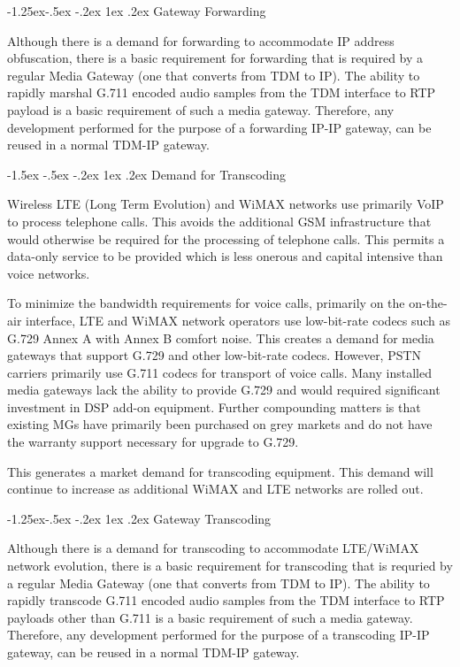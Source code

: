 \documentclass[letterpaper,final,notitlepage,twocolumn,10pt,twoside]{article}
\makeatletter
\let\normalsize = \small
\let\small = \footnotesize
\let\footnotesize = \scriptsize
\let\scriptsize = \tiny
\renewcommand\subsection{\@startsection{subsection}{2}{\z@}%
                                     {-1.5ex \@plus -.5ex \@minus -.2ex}%
                                     {1ex \@plus .2ex}%
                                     {\normalfont\normalsize\bfseries}}
\renewcommand\subsubsection{\@startsection{subsubsection}{3}{\z@}%
                                     {-1.25ex\@plus -.5ex \@minus -.2ex}%
                                     {1ex \@plus .2ex}%
                                     {\normalfont\normalsize\bfseries}}
\makeatother
\begin{document}
\subsubsection{Gateway Forwarding}

Although there is a demand for forwarding to accommodate IP address
obfuscation, there is a basic requirement for forwarding that is required by
a regular Media Gateway (one that converts from TDM to IP).  The ability to
rapidly marshal G.711 encoded audio samples from the TDM interface to RTP
payload is a basic requirement of such a media gateway.  Therefore, any
development performed for the purpose of a forwarding IP-IP gateway, can be
reused in a normal TDM-IP gateway.

\subsection{Demand for Transcoding}

Wireless LTE (Long Term Evolution) and WiMAX networks use primarily VoIP to
process telephone calls.  This avoids the additional GSM infrastructure that
would otherwise be required for the processing of telephone calls.  This permits
a data-only service to be provided which is less onerous and capital intensive
than voice networks.

To minimize the bandwidth requirements for voice calls, primarily on the
on-the-air interface, LTE and WiMAX network operators use low-bit-rate codecs
such as G.729 Annex A with Annex B comfort noise.  This creates a demand for
media gateways that support G.729 and other low-bit-rate codecs.  However, PSTN
carriers primarily use G.711 codecs for transport of voice calls.  Many
installed media gateways lack the ability to provide G.729 and would required
significant investment in DSP add-on equipment.  Further compounding matters is
that existing MGs have primarily been purchased on grey markets and do not have
the warranty support necessary for upgrade to G.729.

This generates a market demand for transcoding equipment.  This demand will
continue to increase as additional WiMAX and LTE networks are rolled out.

\subsubsection{Gateway Transcoding}

Although there is a demand for transcoding to accommodate LTE/WiMAX network
evolution, there is a basic requirement for transcoding that is requried by a
regular Media Gateway (one that converts from TDM to IP).  The ability to
rapidly transcode G.711 encoded audio samples from the TDM interface to RTP
payloads other than G.711 is a basic requirement of such a media gateway.
Therefore, any development performed for the purpose of a transcoding IP-IP
gateway, can be reused in a normal TDM-IP gateway.
\end{document}
